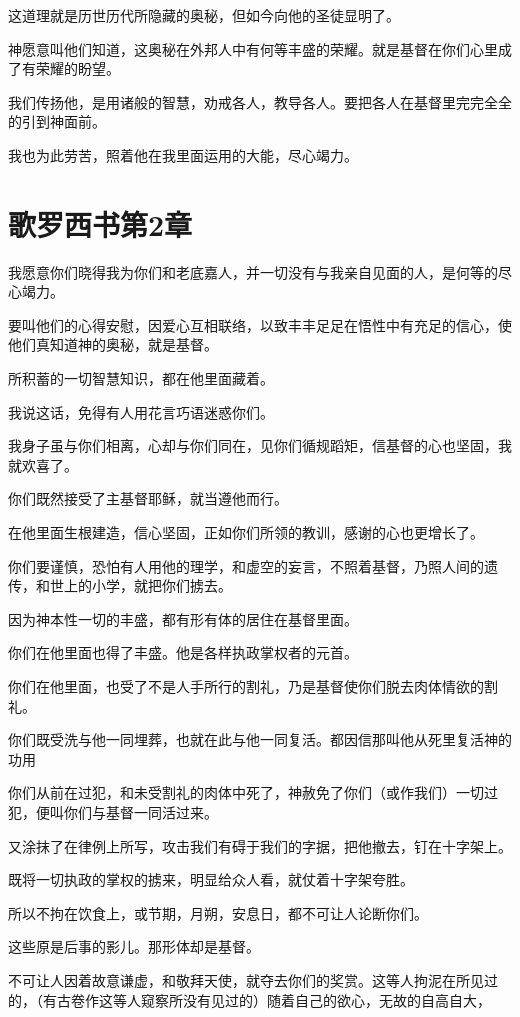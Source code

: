 \documentclass[12pt,oneside]{book}
\begin{document}
这道理就是历世历代所隐藏的奥秘，但如今向他的圣徒显明了。

神愿意叫他们知道，这奥秘在外邦人中有何等丰盛的荣耀。就是基督在你们心里成了有荣耀的盼望。

我们传扬他，是用诸般的智慧，劝戒各人，教导各人。要把各人在基督里完完全全的引到神面前。

我也为此劳苦，照着他在我里面运用的大能，尽心竭力。

\chapter{歌罗西书第2章}
我愿意你们晓得我为你们和老底嘉人，并一切没有与我亲自见面的人，是何等的尽心竭力。

要叫他们的心得安慰，因爱心互相联络，以致丰丰足足在悟性中有充足的信心，使他们真知道神的奥秘，就是基督。

所积蓄的一切智慧知识，都在他里面藏着。

我说这话，免得有人用花言巧语迷惑你们。

我身子虽与你们相离，心却与你们同在，见你们循规蹈矩，信基督的心也坚固，我就欢喜了。

你们既然接受了主基督耶稣，就当遵他而行。

在他里面生根建造，信心坚固，正如你们所领的教训，感谢的心也更增长了。

你们要谨慎，恐怕有人用他的理学，和虚空的妄言，不照着基督，乃照人间的遗传，和世上的小学，就把你们掳去。

因为神本性一切的丰盛，都有形有体的居住在基督里面。

你们在他里面也得了丰盛。他是各样执政掌权者的元首。

你们在他里面，也受了不是人手所行的割礼，乃是基督使你们脱去肉体情欲的割礼。

你们既受洗与他一同埋葬，也就在此与他一同复活。都因信那叫他从死里复活神的功用

你们从前在过犯，和未受割礼的肉体中死了，神赦免了你们（或作我们）一切过犯，便叫你们与基督一同活过来。

又涂抹了在律例上所写，攻击我们有碍于我们的字据，把他撤去，钉在十字架上。

既将一切执政的掌权的掳来，明显给众人看，就仗着十字架夸胜。

所以不拘在饮食上，或节期，月朔，安息日，都不可让人论断你们。

这些原是后事的影儿。那形体却是基督。

不可让人因着故意谦虚，和敬拜天使，就夺去你们的奖赏。这等人拘泥在所见过的，（有古卷作这等人窥察所没有见过的）随着自己的欲心，无故的自高自大，
\end{document}
